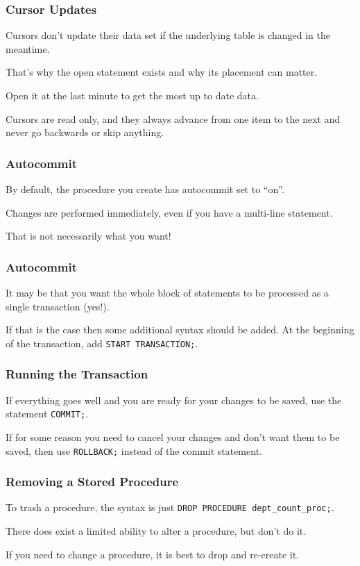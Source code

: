 \begin{frame}
\frametitle{Cursor Updates}

Cursors don't update their data set if the underlying table is changed in the meantime. 

That's why the open statement exists and why its placement can matter. 

Open it at the last minute to get the most up to date data. 

Cursors are read only, and they always advance from one item to the next and never go backwards or skip anything.

\end{frame}

\begin{frame}
\frametitle{Autocommit}

By default, the procedure you create has autocommit set to ``on''.

Changes are performed immediately, even if you have a multi-line statement.

That is not necessarily what you want! 

\end{frame}

\begin{frame}
\frametitle{Autocommit}


It may be that you want the whole block of statements to be processed as a single transaction (yes!). 

If that is the case then some additional syntax should be added. At the beginning of the transaction, add \texttt{START TRANSACTION;}.


\end{frame}

\begin{frame}
\frametitle{Running the Transaction}

If everything goes well and you are ready for your changes to be saved, use the statement \texttt{COMMIT;}. 

If for some reason you need to cancel your changes and don't want them to be saved, then use \texttt{ROLLBACK;} instead of the commit statement. 


\end{frame}

\begin{frame}
\frametitle{Removing a Stored Procedure}

To trash a procedure, the syntax is just \texttt{DROP PROCEDURE dept\_count\_proc;}. 

There does exist a limited ability to alter a procedure, but don't do it. 

If you need to change a procedure, it is best to drop and re-create it.

\end{frame}

